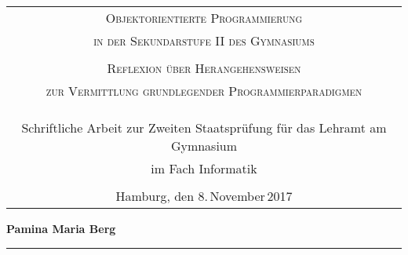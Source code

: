 \begin{titlepage}
\enlargethispage{\baselineskip}

\vspace*{15ex} 
\begin{tabular}{c}

 \\
 \Large\textsc{Objektorientierte Programmierung}\\
\Large\textsc{in der Sekundarstufe II des Gymnasiums} \\
\tiny \\
\normalsize\textsc{Reflexion über Herangehensweisen}\\
\normalsize\textsc{zur Vermittlung grundlegender Programmierparadigmen}\\		  
\\
\\
\\
\normalsize Schriftliche Arbeit zur Zweiten Staatsprüfung für das Lehramt am Gymnasium \\
\normalsize im Fach Informatik\\
\\
\normalsize Hamburg, den 8.\,November\,2017

\end{tabular}

\vspace*{10ex}
	\noindent \textbf{Pamina Maria Berg}\\
	\noindent \rule{\textwidth}{0.4mm} 
	 \\	


\end{titlepage}
